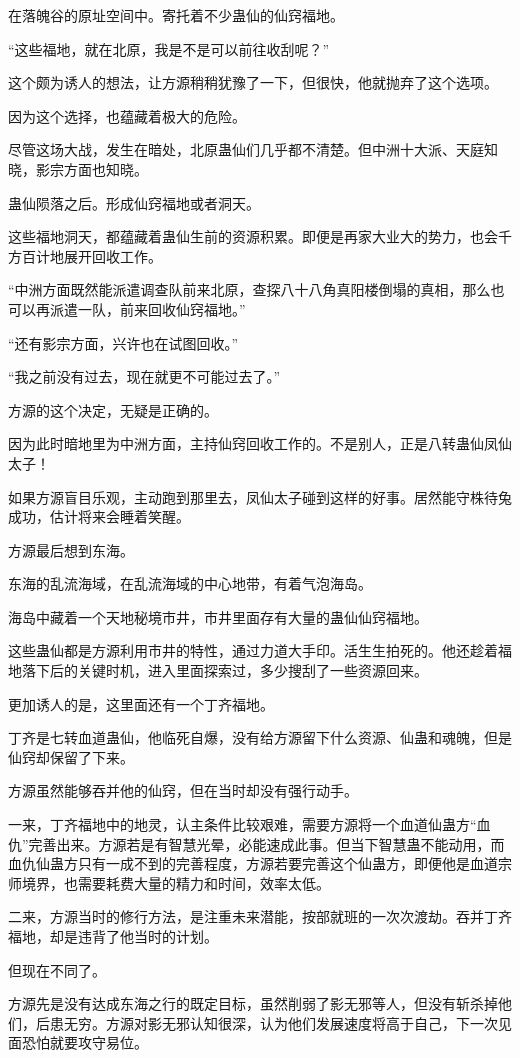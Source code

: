 \begin{this_body}
在落魄谷的原址空间中。寄托着不少蛊仙的仙窍福地。

“这些福地，就在北原，我是不是可以前往收刮呢？”

这个颇为诱人的想法，让方源稍稍犹豫了一下，但很快，他就抛弃了这个选项。

因为这个选择，也蕴藏着极大的危险。

尽管这场大战，发生在暗处，北原蛊仙们几乎都不清楚。但中洲十大派、天庭知晓，影宗方面也知晓。

蛊仙陨落之后。形成仙窍福地或者洞天。

这些福地洞天，都蕴藏着蛊仙生前的资源积累。即便是再家大业大的势力，也会千方百计地展开回收工作。

“中洲方面既然能派遣调查队前来北原，查探八十八角真阳楼倒塌的真相，那么也可以再派遣一队，前来回收仙窍福地。”

“还有影宗方面，兴许也在试图回收。”

“我之前没有过去，现在就更不可能过去了。”

方源的这个决定，无疑是正确的。

因为此时暗地里为中洲方面，主持仙窍回收工作的。不是别人，正是八转蛊仙凤仙太子！

如果方源盲目乐观，主动跑到那里去，凤仙太子碰到这样的好事。居然能守株待兔成功，估计将来会睡着笑醒。

方源最后想到东海。

东海的乱流海域，在乱流海域的中心地带，有着气泡海岛。

海岛中藏着一个天地秘境市井，市井里面存有大量的蛊仙仙窍福地。

这些蛊仙都是方源利用市井的特性，通过力道大手印。活生生拍死的。他还趁着福地落下后的关键时机，进入里面探索过，多少搜刮了一些资源回来。

更加诱人的是，这里面还有一个丁齐福地。

丁齐是七转血道蛊仙，他临死自爆，没有给方源留下什么资源、仙蛊和魂魄，但是仙窍却保留了下来。

方源虽然能够吞并他的仙窍，但在当时却没有强行动手。

一来，丁齐福地中的地灵，认主条件比较艰难，需要方源将一个血道仙蛊方“血仇”完善出来。方源若是有智慧光晕，必能速成此事。但当下智慧蛊不能动用，而血仇仙蛊方只有一成不到的完善程度，方源若要完善这个仙蛊方，即便他是血道宗师境界，也需要耗费大量的精力和时间，效率太低。

二来，方源当时的修行方法，是注重未来潜能，按部就班的一次次渡劫。吞并丁齐福地，却是违背了他当时的计划。

但现在不同了。

方源先是没有达成东海之行的既定目标，虽然削弱了影无邪等人，但没有斩杀掉他们，后患无穷。方源对影无邪认知很深，认为他们发展速度将高于自己，下一次见面恐怕就要攻守易位。


\end{this_body}
